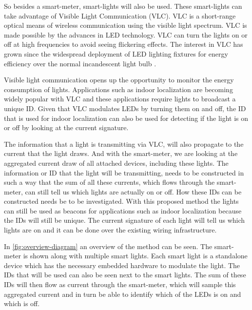 	So besides a smart-meter, smart-lights will also be used.
	These smart-lights can take advantage of Visible Light Communication (VLC).
	VLC is a short-range optical means of wireless communication using the visible light spectrum.
	VLC is made possible by the advances in LED technology.
	VLC can turn the lights on or off at high frequencies to avoid seeing flickering effects.
	The interest in VLC has grown since the widespread deployment of LED lighting fixtures for energy efficiency over the normal incandescent light bulb \cite{rajagopal2012ieee}.


	Visible light communication opens up the opportunity to monitor the energy consumption of lights. Applications such as indoor localization are becoming widely popular with VLC and these applications require lights to broadcast a unique ID. 
	Given that VLC modulates LEDs by turning them on and off, the ID that is used for indoor localization can also be used for detecting if the light is on or off by looking at the current signature.


	The information that a light is transmitting via VLC, will also propagate to the current that the light draws.
	And with the smart-meter, we are looking at the aggregated current draw of all attached devices, including these lights.
	The information or ID that the light will be transmitting, needs to be constructed in such a way that the sum of all these currents, which flows through the smart-meter, can still tell us which lights are actually on or off.
	How these IDs can be constructed needs be to be investigated.
	With this proposed method the lights can still be used as beacons for applications such as indoor localization because the IDs will still be unique.
	The current signature of each light will tell us which lights are on and it can be done over the existing wiring infrastructure.

	In \autoref{fig:overview-diagram} an overview of the method can be seen.
	The smart-meter is shown along with multiple smart lights. 
	Each smart light is a standalone device which has the necessary embedded hardware to modulate the light.
	The IDs that will be used can also be seen next to the smart lights.
	The sum of these IDs will then flow as current through the smart-meter, which will sample this aggregated current and in turn be able to identify which of the LEDs is on and which is off.


